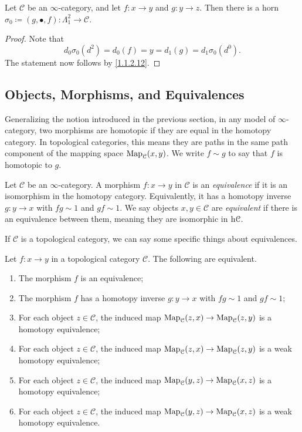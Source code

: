 \begin{proposition}\label{1.2.3.12}
	Let $\mathcal{C} $ be an $\infty $-category, and let $f : x \to y$ and $g : y \to z$. Then there is a horn $\sigma _0 \coloneqq (g,\bullet,f) : \Lambda _1^2 \to \mathcal{C} $.
\end{proposition}
\begin{proof}
	Note that
	\[
		d_0\sigma _0(d^2)=d_0(f)=y=d_1(g)=d_1\sigma _0(d^0)
	.\]
	The statement now follows by \cref{1.1.2.12}.
\end{proof}

\subsection{Objects, Morphisms, and Equivalences}

Generalizing the notion introduced in the previous section, in any model of $\infty $-category, two morphisms are homotopic if they are equal in the homotopy category. In topological categories, this means they are paths in the same path component of the mapping space $\operatorname{Map}_\mathcal{C} (x,y)$. We write $f\sim g$ to say that $f$ is homotopic to $g$.

\begin{definition}\label{1.2.4.1}
	Let $\mathcal{C} $ be an $\infty $-category. A morphism $f : x \to y$ in $\mathcal{C} $ is an \emph{equivalence} if it is an isomorphism in the homotopy category. Equivalently, it has a homotopy inverse $g : y \to x$ with $fg\sim 1$ and $gf\sim 1$. We say objects $x,y\in \mathcal{C} $ are \emph{equivalent} if there is an equivalence between them, meaning they are isomorphic in $\mathrm{h} \mathcal{C} $.
\end{definition}

If $\mathcal{C} $ is a topological category, we can say some specific things about equivalences.

\begin{proposition}\label{1.2.4.2}
	Let $f : x \to y$ in a topological category $\mathcal{C} $. The following are equivalent.
	\begin{enumerate}
		\item The morphism $f$ is an equivalence;
		\item The morphism $f$ has a homotopy inverse $g : y \to x$ with $fg\sim 1$ and $gf\sim 1$;
		\item For each object $z\in \mathcal{C} $, the induced map $\operatorname{Map}_\mathcal{C} (z,x)\to \operatorname{Map}_\mathcal{C} (z,y)$ is a homotopy equivalence;
		\item For each object $z\in \mathcal{C} $, the induced map $\operatorname{Map}_\mathcal{C} (z,x)\to \operatorname{Map}_\mathcal{C} (z,y)$ is a weak homotopy equivalence;
		\item For each object $z\in \mathcal{C} $, the induced map $\operatorname{Map}_\mathcal{C} (y,z)\to \operatorname{Map}_\mathcal{C} (x,z)$ is a homotopy equivalence;
		\item For each object $z\in \mathcal{C} $, the induced map $\operatorname{Map}_\mathcal{C} (y,z)\to \operatorname{Map}_\mathcal{C} (x,z)$ is a weak homotopy equivalence.
	\end{enumerate}
\end{proposition}

